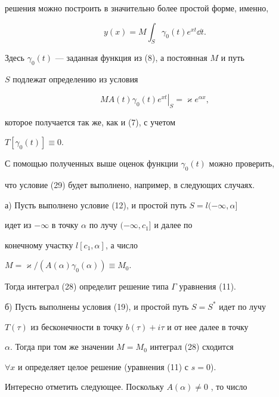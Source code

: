 {решения можно построить в значительно более простой форме, именно,


\begin{equation}


y(x)=M\int_{S}\gamma_0(t)e^{xt}\dd t.


\end{equation}


Здесь $\gamma_0(t)$ --- заданная функция из (8), а постоянная $M$ и путь


$S$ подлежат определению из условия


\begin{equation}


\left. MA(t)\gamma_0(t)e^{xt}\right|_S=\varkappa e^{\alpha x},


\end{equation}


которое получается так же, как и (7), с учетом


$T[\gamma_0(t)]\equiv 0$.





С помощью полученных выше оценок функции $\gamma_0(t)$ можно проверить,


что условие (29) будет выполнено, например, в следующих случаях.





а) Пусть выполнено условие (12), и простой путь $S=l(-\infty,\alpha]$


идет из $-\infty$ в точку $\alpha$ по лучу $(-\infty,c_1]$ и далее по


конечному участку $l[c_1,\alpha]$, а число


$M=\varkappa/(A(\alpha)\gamma_0(\alpha))\equiv M_0$.


Тогда интеграл (28) определит решение типа $\Gamma$ уравнения (11).





б) Пусть выполнены условия (19), и простой путь $S=S^*$ идет по лучу


$T(\tau)$ из бесконечности в точку $b(\tau)+i\tau$ и от нее далее в точку


$\alpha$. Тогда при том же значении $M=M_0$ интеграл (28) сходится


$\forall x$ и определяет целое решение (уравнения (11) с $s=0$).





Интересно отметить следующее. Поскольку $A(\alpha)\ne 0$ , то число


}
